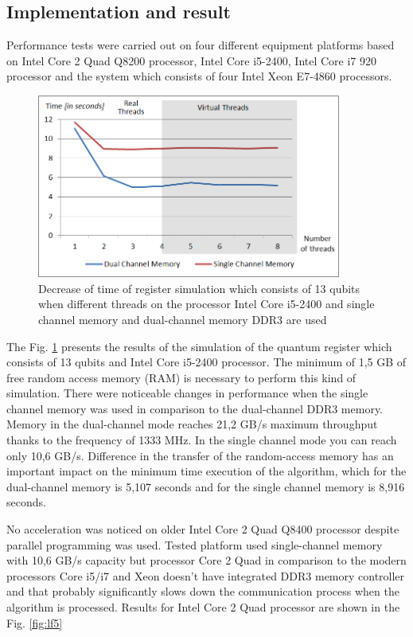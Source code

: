 \documentclass[10pt, a5paper]{article}
\begin{document}
\subsection*{Implementation and result}

Performance tests were carried out on four different equipment platforms based on Intel Core 2 Quad Q8200 processor, Intel Core i5-2400, Intel Core i7 920 processor and the system which consists of four Intel Xeon E7-4860 processors.

\begin{figure}
  \centering
  \includegraphics[width=10cm]{18_2012_2b.png}
  \caption{Decrease of time of register simulation which consists of 13 qubits when different threads on the processor Intel Core i5-2400 and single channel memory and dual-channel memory DDR3 are used}
  \label{fig:lf2}
\end{figure}

The Fig. \ref{fig:lf2} presents the results of the simulation of the quantum register which consists of 13 qubits and Intel Core i5-2400 processor. The minimum of 1,5 GB of free random access memory (RAM) is necessary to perform this kind of simulation. There were noticeable changes in performance when the single channel memory was used in comparison to the dual-channel DDR3 memory. Memory in the dual-channel mode reaches 21,2 GB/s maximum throughput thanks to the frequency of 1333 MHz. In the single channel mode you can reach only 10,6 GB/s. Difference in the transfer of the random-access memory has an important impact on the minimum time execution of the algorithm, which for the dual-channel memory is 5,107 seconds and for the single channel memory is 8,916 seconds.

No acceleration was noticed on older Intel Core 2 Quad Q8400 processor despite  parallel programming was used. Tested platform used single-channel memory with 10,6 GB/s capacity  but processor Core 2 Quad in comparison to the modern processors Core i5/i7 and Xeon doesn't have integrated DDR3 memory controller and that probably significantly slows down the communication process when the algorithm is processed. Results for Intel Core 2 Quad processor are shown in the Fig. \ref{fig:lf5}
\end{document}
